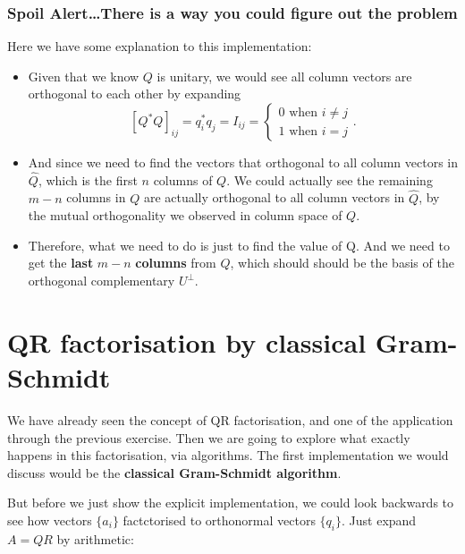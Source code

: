 \subsubsection*{Spoil Alert\ldots There is a way you could figure out the problem}%
\label{ssub:analysis}
Here we have some explanation to this implementation:
\begin{itemize}
\item Given that we know $Q$ is unitary, we would see all column vectors are orthogonal to each other by expanding
  \[
    [Q^*Q]_{ij} = q_i^*q_j = I_{ij} = \left\{
      \begin{array}{l}
      0 \text{ when $i \neq j$} \\
      1 \text{ when $i = j$}
      \end{array}
    \right.
  .\] 
  \item And since we need to find the vectors that orthogonal to all column vectors in $\hat{Q}$, which is the first $n$ columns of $Q$. We could actually see the remaining $m - n$ columns in  $Q$ are actually orthogonal to all column vectors in $\hat{Q}$, by the mutual orthogonality we observed in column space of $Q$. 
  \item Therefore, what we need to do is just to find the value of Q. And we need to get the \textbf{last} $m - n$ \textbf{columns} from $Q$, which should should be the basis of the orthogonal complementary $U^{\bot}$.
\end{itemize}

\newpage
\section{QR factorisation by classical Gram-Schmidt}%
We have already seen the concept of QR factorisation, and one of the application through the previous exercise. Then we are going to explore what exactly happens in this factorisation, via algorithms. The first implementation we would discuss would be the \textbf{classical Gram-Schmidt algorithm}. 

\medskip
\noindent But before we just show the explicit implementation, we could look backwards to see how vectors $ \{a_i\} $ factctorised to orthonormal vectors $ \{q_i\} $. Just expand $A = QR$ by arithmetic:

